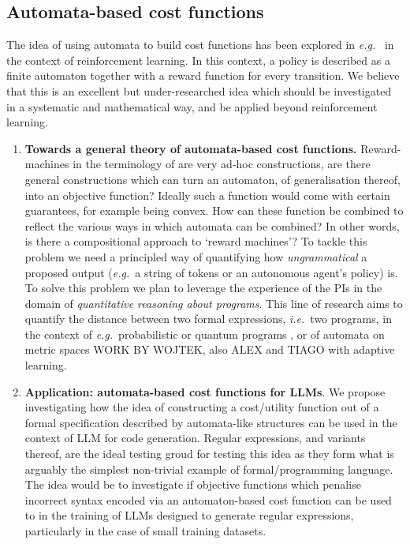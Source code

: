 \documentclass[11pt,a4paper]{article}
\newcommand{\ie}{\textit{i.e.}\ }
\newcommand{\eg}{\textit{e.g.}\ }
\begin{document}
		\subsection{Automata-based cost functions}
			The idea of using automata to build cost functions has been explored in \eg\cite{icarte2022reward} in the context of reinforcement learning. In this context, a policy is described as a finite automaton together with a reward function for every transition.  
			We believe that this is an excellent but under-researched idea which should be investigated in a systematic and mathematical way, and be applied beyond reinforcement learning. 
			\begin{enumerate}
				\item \textbf{Towards a general theory of automata-based cost functions.}  Reward-machines in the terminology of \cite{icarte2022reward} are very ad-hoc constructions, are there general constructions which can turn an automaton, of generalisation thereof, into an objective function? Ideally such a function would come with certain guarantees, for example being convex. How can these function be combined to reflect the various ways in which automata can be combined? In other words, is there a compositional approach to `reward machines'? To tackle this problem we need a principled way of quantifying how \emph{ungrammatical} a proposed output (\eg a string of tokens or an autonomous agent's policy) is. To solve this problem we plan to leverage the experience of the PIs in the domain of \emph{quantitative reasoning about programs}. This line of research aims to quantify the distance between two formal expressions, \ie two programs, in the context of \eg probabilistic or quantum programs \cite{Veq23,graded23}, or of automata on metric spaces \cite{?} WORK BY WOJTEK, also ALEX and TIAGO with adaptive learning. 
				\item \textbf{Application: automata-based cost functions for LLMs}. We propose investigating how the idea of constructing a cost/utility function out of a formal specification described by automata-like structures can be used in the context of LLM for code generation. Regular expressions, and variants thereof, are the ideal testing groud for testing this idea as they form what is arguably the simplest non-trivial example of formal/programming language. The idea would be to investigate if objective functions which penalise incorrect syntax encoded via an automaton-based cost function can be used to in the training of LLMs designed to generate regular expressions, particularly in the case of small training datasets.
			\end{enumerate} 
		
\end{document}
